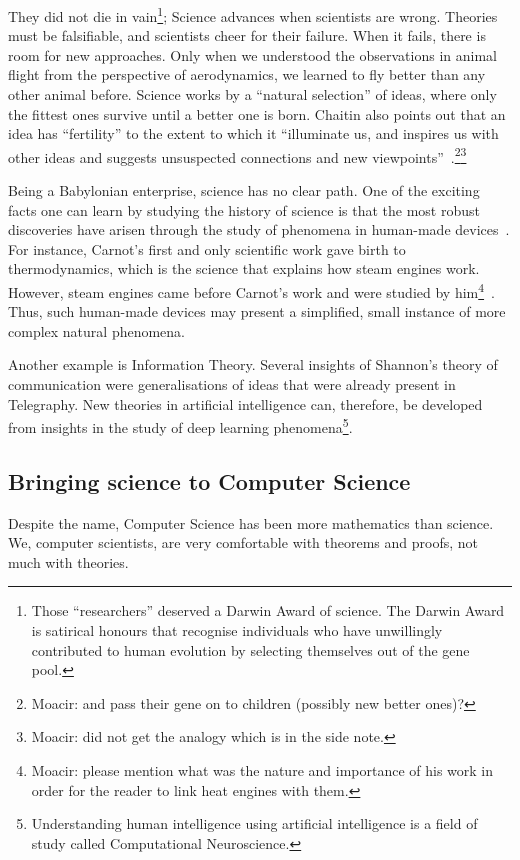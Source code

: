 They did not die in vain\footnote{Those ``researchers'' deserved a Darwin Award of science. The Darwin Award is satirical honours that recognise individuals who have unwillingly contributed to human evolution by selecting themselves out of the gene pool.}; Science advances when scientists are wrong. Theories must be falsifiable, and scientists cheer for their failure. When it fails, there is room for new approaches. Only when we understood the observations in animal flight from the perspective of aerodynamics, we learned to fly better than any other animal before. Science works by a ``natural selection'' of ideas, where only the fittest ones survive until a better one is born. Chaitin also points out that an idea has ``fertility'' to the extent to which it ``illuminate us, and inspires us with other ideas and suggests unsuspected connections and new viewpoints''~\cite[p. 9]{chaitin:2006}.\footnote{Moacir: and pass their gene on to children (possibly new better ones)?}\footnote{Moacir: did not get the analogy which is in the side note. }

Being a Babylonian enterprise, science has no clear path. One of the exciting facts one can learn by studying the history of science is that the most robust discoveries have arisen through the study of phenomena in human-made devices~\cite{pierce:1980}. For instance, Carnot's first and only scientific work\cite{klein:1974} gave birth to thermodynamics, which is the science that explains how steam engines work. However, steam engines came before Carnot's work and were studied by him\footnote{Moacir: please mention what was the nature and importance of his work in order for the reader to link heat engines with them.}~\cite{pierce:1980}. Thus, such human-made devices may present a simplified, small instance of more complex natural phenomena.

Another example is Information Theory. Several insights of Shannon's theory of communication were generalisations of ideas that were already present in Telegraphy. New theories in artificial intelligence can, therefore,  be developed from insights in the study of deep learning phenomena\footnote{Understanding human intelligence using artificial intelligence is a field of study called Computational Neuroscience.}.


\subsection{Bringing science to Computer Science} Despite the name, Computer Science has been more mathematics than science. We, computer scientists, are very comfortable with theorems and proofs, not much with theories.

